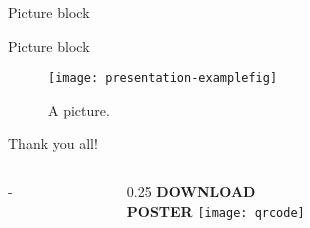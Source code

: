\documentclass[english,xcolor=table,t]{beamer}
\begin{document}
\begin{frame}
\begin{columns}
\begin{vfillcolumn}{\colwidth}
\begin{block}{Picture block}
\end{block}

\vfill 
\begin{block}{Picture block}
\begin{figure}
	\centering
    \texttt{[image: presentation-examplefig]}
	\caption{A picture.}
\end{figure}

\end{block}

\vfill

\begin{minipage}{0.75\colwidth}

\begin{exampleblock}{}
\vskip 3cm
Thank you all!

\vskip 3cm

\blockhrule

\vskip 3cm



\vskip 3cm
\end{exampleblock}

\end{minipage}

\begin{exampleblock}{}
\vskip -3cm
\end{exampleblock}

\end{vfillcolumn}
\end{columns}

\vskip -16cm
      \begin{columns}[T,totalwidth=\paperwidth]
        \begin{column}{\colwidth-\margin} \end{column} %
        
        \begin{column}{0.25\colwidth}
          \centering
          \Large \textbf{DOWNLOAD \\ POSTER} \vskip 2cm
          \texttt{[image: qrcode]}
        \end{column}
        \begin{column}{\margin} \end{column} %
      \end{columns}
\end{frame}
\end{document}
